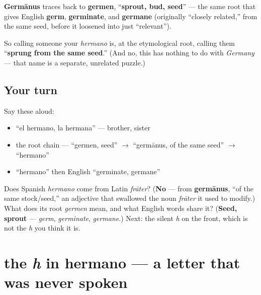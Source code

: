 \begin{culture}
\textbf{Germānus} traces back to \textbf{germen}, \textquotedblleft{}\textbf{sprout, bud, seed}\textquotedblright{} — the same root that gives English \textbf{germ}, \textbf{germinate}, and \textbf{germane} (originally \textquotedblleft{}closely related,\textquotedblright{} from the same seed, before it loosened into just \textquotedblleft{}relevant\textquotedblright{}).

So calling someone your \emph{hermano} is, at the etymological root, calling them \textquotedblleft{}\textbf{sprung from the same seed}.\textquotedblright{} (And no, this has nothing to do with \emph{Germany} — that name is a separate, unrelated puzzle.)
\end{culture}

\subsection*{Your turn}
Say these aloud:

\begin{itemize}
\raggedright
  \item \textquotedblleft{}el hermano, la hermana\textquotedblright{} — brother, sister
  \item the root chain — \textquotedblleft{}germen, seed\textquotedblright{} $\to$ \textquotedblleft{}germānus, of the same seed\textquotedblright{} $\to$ \textquotedblleft{}hermano\textquotedblright{}
  \item \textquotedblleft{}hermano\textquotedblright{} then English \textquotedblleft{}germinate, germane\textquotedblright{}
\end{itemize}

\begin{tcolorbox}[breakable,colback=teal!4,colframe=teal!35!black,title={Before you move on}]
Does Spanish \emph{hermano} come from Latin \emph{frāter}? (\textbf{No} — from \textbf{germānus}, \textquotedblleft{}of the same stock/seed,\textquotedblright{} an adjective that swallowed the noun \emph{frāter} it used to modify.) What does its root \emph{germen} mean, and what English words share it? (\textbf{Seed, sprout} — \emph{germ}, \emph{germinate}, \emph{germane}.) Next: the silent \emph{h} on the front, which is not the \emph{h} you think it is.
\end{tcolorbox}
\section[hermano from \emph{ermano}]{the \emph{h} in hermano — a letter that was never spoken}

